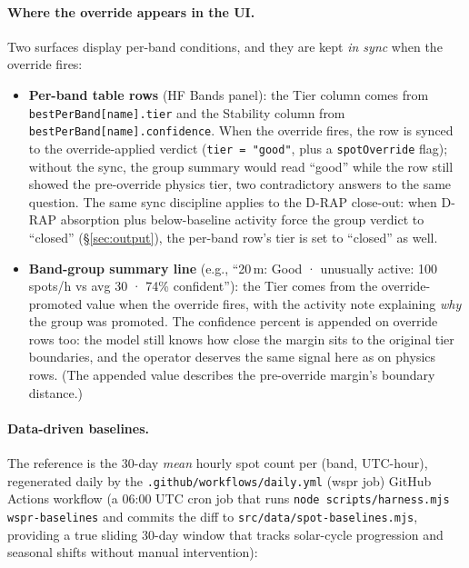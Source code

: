 \documentclass[11pt,a4paper]{article}
\begin{document}
\paragraph{Where the override appears in the UI.}  Two surfaces
display per-band conditions, and they are kept \emph{in sync}
when the override fires:
\begin{itemize}[nosep]
  \item \textbf{Per-band table rows} (HF Bands panel): the Tier
        column comes from
        \texttt{bestPerBand[name].tier} and the Stability column
        from \texttt{bestPerBand[name].confidence}.  When the
        override fires, the row is synced to the override-applied
        verdict (\texttt{tier = "good"}, plus a
        \texttt{spotOverride} flag); without the sync, the group
        summary would read ``good'' while the row still showed the
        pre-override physics tier, two contradictory answers
        to the same question.  The same sync discipline applies
        to the D-RAP close-out: when D-RAP absorption plus
        below-baseline activity force the group verdict to
        ``closed'' (\S\ref{sec:output}), the per-band row's tier
        is set to ``closed'' as well.
  \item \textbf{Band-group summary line} (e.g., ``20\,m: Good ·
        unusually active: 100 spots/h vs avg 30 · 74\%
        confident''):
        the Tier comes from the override-promoted value when the
        override fires, with the activity note explaining
        \emph{why} the group was promoted.  The confidence
        percent is appended on override rows too: the model
        still knows how close the margin sits to the original
        tier boundaries, and the operator deserves the same
        signal here as on physics rows.  (The
        appended value describes the pre-override margin's
        boundary distance.)
\end{itemize}

\paragraph{Data-driven baselines.}  The reference is the
30-day \emph{mean} hourly spot count per (band, UTC-hour),
regenerated daily by the
\texttt{.github/workflows/daily.yml} (wspr job) GitHub
Actions workflow (a 06:00 UTC cron job that runs
\texttt{node scripts/harness.mjs wspr-baselines} and commits the
diff to \texttt{src/data/spot-baselines.mjs}, providing a true
sliding 30-day window that tracks solar-cycle progression and
seasonal shifts without manual intervention):
\end{document}
